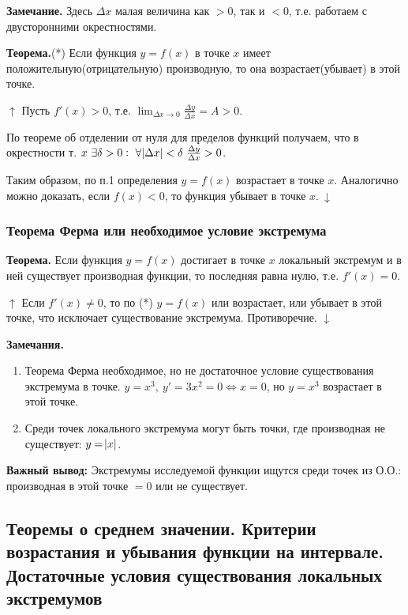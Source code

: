 \documentclass{article}
\begin{document}
\textbf{Замечание.} Здесь \(\Delta x\) малая величина как \(>0\), так и \(<0\), т.е. работаем с двусторонними окрестностями.

\textbf{Теорема.}(*) Если функция \(y = f(x)\) в точке \(x\) имеет положительную(отрицательную) производную, то она возрастает(убывает) в этой точке.

\(\uparrow\) Пусть \(f'(x) > 0\), т.е. \(\lim_{\Delta x \to 0} \frac{\Delta y}{\Delta x} = A > 0\).

По теореме об отделении от нуля для пределов функций получаем, что в окрестности т. \(x\ \exists \delta > 0:\ \forall \abs{\Delta x} < \delta\ \frac{\Delta y}{\Delta x} > 0\).

Таким образом, по п.1 определения \(y = f(x)\) возрастает в точке \(x\). Аналогично можно доказать, если \(f(x) < 0\), то функция убывает в точке \(x.\ \downarrow\)

\subsubsection{Теорема Ферма или необходимое условие экстремума}

\textbf{Теорема.} Если функция \(y = f(x)\) достигает в точке \(x\) локальный экстремум и в ней существует производная функции, то последняя равна нулю, т.е. \(f'(x) = 0\).

\(\uparrow\) Если \(f'(x) \neq 0\), то по (*) \(y = f(x)\) или возрастает, или убывает в этой точке, что исключает существование экстремума. Противоречие. \(\downarrow\)

\textbf{Замечания.}
\begin{enumerate}
    \item Теорема Ферма необходимое, но не достаточное условие существования экстремума в точке. \(y = x^3,\ y' = 3x^2 = 0 \Leftrightarrow x = 0\), но \(y = x^3\) возрастает в этой точке.
    \item Среди точек локального экстремума могут быть точки, где производная не существует: \(y = \abs{x}\).
\end{enumerate}

\textbf{Важный вывод:} Экстремумы исследуемой функции ищутся среди точек из О.О.: производная в этой точке \(= 0\) или не существует.

\subsection{Теоремы о среднем значении. Критерии возрастания и убывания функции на интервале. Достаточные условия существования локальных экстремумов}
\end{document}
